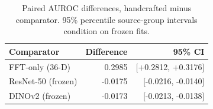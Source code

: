 \begin{table}[t]\caption{Paired AUROC differences, handcrafted minus comparator. 95\% percentile source-group intervals condition on frozen fits.}\label{tab:paired}\centering\footnotesize\begin{tabular}{lrr}\toprule
\textbf{Comparator} & \textbf{Difference} & \textbf{95\% CI}\\\midrule
{}FFT-only (36-D) & 0.2985 & [+0.2812, +0.3176]\\
{}ResNet-50 (frozen) & -0.0175 & [-0.0216, -0.0140]\\
{}DINOv2 (frozen) & -0.0173 & [-0.0213, -0.0138]\\
\bottomrule\end{tabular}\end{table}